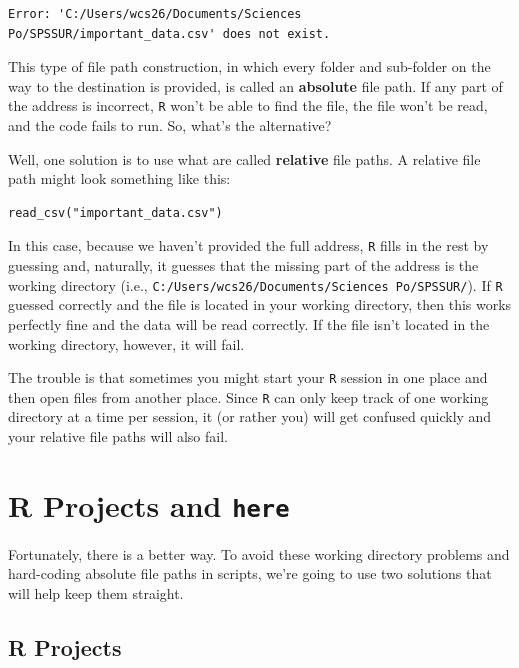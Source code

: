 \documentclass[
  letterpaper,
]{book}
\begin{document}
\begin{verbatim}
Error: 'C:/Users/wcs26/Documents/Sciences Po/SPSSUR/important_data.csv' does not exist.
\end{verbatim}

This type of file path construction, in which every folder and
sub-folder on the way to the destination is provided, is called an
\textbf{absolute} file path. If any part of the address is incorrect,
\texttt{R} won't be able to find the file, the file won't be read, and
the code fails to run. So, what's the alternative?

Well, one solution is to use what are called \textbf{relative} file
paths. A relative file path might look something like this:

\begin{verbatim}
read_csv("important_data.csv")
\end{verbatim}

In this case, because we haven't provided the full address, \texttt{R}
fills in the rest by guessing and, naturally, it guesses that the
missing part of the address is the working directory (i.e.,
\texttt{C:/Users/wcs26/Documents/Sciences\ Po/SPSSUR/}). If \texttt{R}
guessed correctly and the file is located in your working directory,
then this works perfectly fine and the data will be read correctly. If
the file isn't located in the working directory, however, it will fail.

The trouble is that sometimes you might start your \texttt{R} session in
one place and then open files from another place. Since \texttt{R} can
only keep track of one working directory at a time per session, it (or
rather you) will get confused quickly and your relative file paths will
also fail.

\hypertarget{r-projects-and-here}{%
\section{\texorpdfstring{R Projects and
\texttt{here}}{R Projects and here}}\label{r-projects-and-here}}

Fortunately, there is a better way. To avoid these working directory
problems and hard-coding absolute file paths in scripts, we're going to
use two solutions that will help keep them straight.

\hypertarget{r-projects}{%
\subsection{R Projects}\label{r-projects}}
\end{document}
